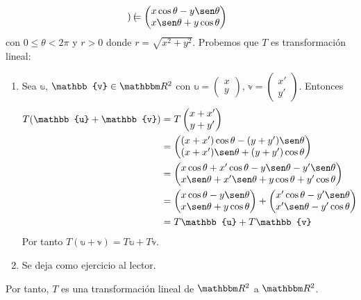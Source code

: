 \begin{example}
\begin{align*}
\begin{pmatrix}
        \end{pmatrix} = \begin{pmatrix}
            x \cos \theta - y \sen \theta \\
            x \sen \theta + y \cos \theta
        \end{pmatrix}
    \end{align*}
    con $0 \leq \theta < 2 \pi$ y $r > 0$ donde $r = \sqrt{x^2+y^2}$. Probemos que $T$ es transformación lineal:
    \begin{enumerate}[label=\roman*)]
        \item Sea $\mathbb{u}$, $\mathbb{v} \in \RR[2]$ con $\mathbb{u} = \begin{pmatrix}
            x \\
            y
        \end{pmatrix}$, $\mathbb{v} = \begin{pmatrix}
            x' \\
            y'
        \end{pmatrix}$. Entonces
        \begin{align*}
            T(\mathbb{u} + \mathbb{v}) & = T \begin{pmatrix}
                x + x' \\
                y + y'
            \end{pmatrix} \\
            & = \begin{pmatrix}
                (x + x') \cos \theta - (y + y') \sen \theta \\
                (x + x') \sen \theta + (y + y') \cos \theta
            \end{pmatrix} \\
            & = \begin{pmatrix}
                x \cos \theta + x' \cos \theta - y \sen \theta - y' \sen \theta \\
                x \sen \theta + x' \sen \theta + y \cos \theta + y' \cos \theta
            \end{pmatrix} \\
            & = \begin{pmatrix}
                x \cos \theta - y \sen \theta \\
                x \sen \theta + y \cos \theta
            \end{pmatrix} + \begin{pmatrix}
                x' \cos \theta - y' \sen \theta \\
                x' \sen \theta - y' \cos \theta
            \end{pmatrix} \\
            & = T\mathbb{u} + T\mathbb{v}
        \end{align*}
        Por tanto $T(\mathbb{u} + \mathbb{v}) = T\mathbb{u} + T\mathbb{v}$.
        \item Se deja como ejercicio al lector.
    \end{enumerate}
    Por tanto, $T$ es una transformación lineal de $\RR[2]$ a $\RR[2]$.
\end{example}


